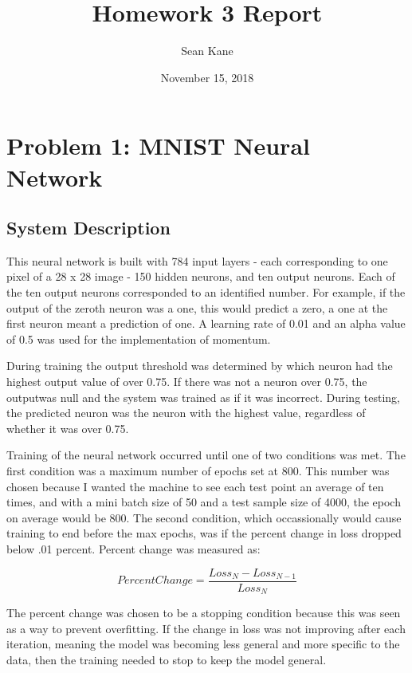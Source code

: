 \documentclass[12pt, letterpaper, twoside]{article}
\title{Homework 3 Report}
\date{November 15, 2018}
\author{Sean Kane}
\begin{document}
\maketitle
\section{Problem 1: MNIST Neural Network}


\subsection{System Description}

This neural network is built with 784 input layers - each corresponding to one pixel of a 28 x 28 
image - 150 hidden neurons, and ten output neurons. Each of the ten output neurons corresponded to an
identified number. For example, if the output of the zeroth neuron was a one, this would predict a 
zero, a one at the first neuron meant a prediction of one. A learning rate of 0.01 and an alpha value 
of 0.5 was used for the implementation of momentum. 

During training the output threshold was determined by which neuron had the highest output value of 
over 0.75. If there was not a neuron over 0.75, the outputwas null and the system was trained as if 
it was incorrect. During testing, the predicted neuron was the neuron with the highest value, regardless
of whether it was over 0.75. 

Training of the neural network occurred until one of two conditions was met. The first condition was a 
maximum number of epochs set at 800. This number was chosen because I wanted the machine to see each 
test point an average of ten times, and with a mini batch size of 50 and a test sample size of 4000, 
the epoch on average would be 800. The second condition, which occassionally would cause training to end
before the max epochs, was if the percent change in loss dropped below .01 percent. Percent change was 
measured as:

\[
    PercentChange = \frac{Loss_{N} - Loss_{N-1}}{Loss_{N}}
\]

The percent change was chosen to be a stopping condition because this was seen as a way to prevent overfitting.
If the change in loss was not improving after each iteration, meaning the model was becoming less general
and more specific to the data, then the training needed to stop to keep the model general.
\end{document}
